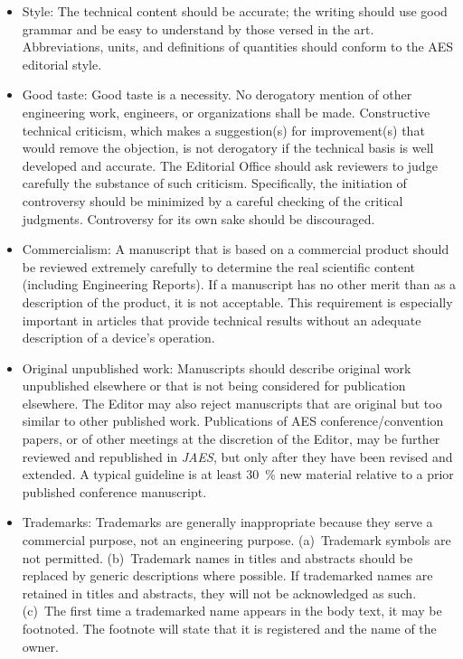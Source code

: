 \documentclass[fleqn]{jaes}
\begin{document}
\begin{itemize}
    \item Style: The technical content should be accurate; the writing should use good grammar and be easy to understand by those versed in the art. Abbreviations, units, and definitions of quantities should conform to the AES editorial style.
    
    \item Good taste: Good taste is a necessity. No derogatory mention of other engineering work, engineers, or organizations shall be made. Constructive technical criticism, which makes a suggestion(s) for improvement(s) that would remove the objection, is not derogatory if the technical basis is well developed and accurate. The Editorial Office should ask reviewers to judge carefully the substance of such criticism. Specifically, the initiation of controversy should be minimized by a careful checking of the critical judgments. Controversy for its own sake should be discouraged.
    
    \item Commercialism: A manuscript that is based on a commercial product should be reviewed extremely carefully to determine the real scientific content (including Engineering Reports). If a manuscript has no other merit than as a description of the product, it is not acceptable. This requirement is especially important in articles that provide technical results without an adequate description of a device’s operation.
    
    \item Original unpublished work: Manuscripts should describe original work unpublished elsewhere or that is not being considered for publication elsewhere. The Editor may also reject manuscripts that are original but too similar to other published work. Publications of AES conference/convention papers, or of other meetings at the discretion of the Editor, may be further reviewed and republished in \emph{JAES}, but only after they have been revised and extended. A typical guideline is at least \SI{30}{\percent} new material relative to a prior published conference manuscript.
    
    \item Trademarks: Trademarks are generally inappropriate because they serve a commercial purpose, not an engineering purpose. (a)~Trademark symbols are not permitted. (b)~Trademark names in titles and abstracts should be replaced by generic descriptions where possible. If trademarked names are retained in titles and abstracts, they will not be acknowledged as such. (c)~The first time a trademarked name appears in the body text, it may be footnoted. The footnote will state that it is registered and the name of the owner.
\end{itemize}
\end{document}
